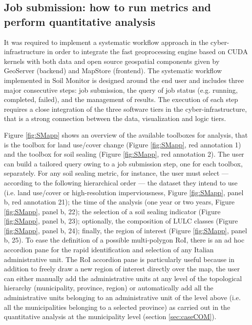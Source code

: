 \documentclass[APA,LATO1COL,doublespace]{WileyNJD-v2}
\begin{document}
\subsection{Job submission: how to run metrics and perform quantitative analysis}
\label{sec:jobsubmission}
It was required to implement a systematic workflow approach in the cyber-infrastructure in order to integrate the fast geoprocessing engine based on CUDA kernels with both data and open source geospatial components given by GeoServer (backend) and MapStore (frontend). 
The systematic workflow implemented in Soil Monitor is designed around the end user and includes three major consecutive steps: job submission, the query of job status (e.g. running, completed, failed), and the management of results.
The execution of each step requires a close integration of the three software tiers in the cyber-infrastructure, that is a strong connection between the data, visualization and logic tiers. 

Figure \ref{fig:SMapp} shows an overview of the available toolboxes for analysis, that is the toolbox for land use/cover change (Figure \ref{fig:SMapp}, red annotation 1) and the toolbox for soil sealing (Figure \ref{fig:SMapp}, red annotation 2).
The user can build a tailored query owing to a job submission step, one for each toolbox, separately. 
For any soil sealing metric, for instance, the user must select --- according to the following hierarchical order --- 
the dataset they intend to use (i.e. land use/cover or high-resolution imperviousness, Figure \ref{fig:SMapp}, panel b, red annotation 21); 
the time of the analysis (one year or two years, Figure \ref{fig:SMapp}, panel b, 22); 
the selection of a soil sealing indicator (Figure \ref{fig:SMapp}, panel b, 23); 
optionally, the composition of LULC classes (Figure \ref{fig:SMapp}, panel b, 24); 
finally, the region of interest (Figure \ref{fig:SMapp}, panel b, 25). 
To ease the definition of a possible multi-polygon RoI, there is an ad hoc accordion pane for the rapid identification and selection of any Italian administrative unit.
The RoI accordion pane is particularly useful because in addition to freely draw a new region of interest directly over the map, the user can either manually add the administrative units at any level of the topological hierarchy (municipality, province, region) 
or automatically add all the administrative units belonging to an administrative unit of the level above (i.e. all the municipalities belonging to a selected province) as carried out in the quantitative analysis at the municipality level (section \ref{sec:caseCOM}).
\end{document}
